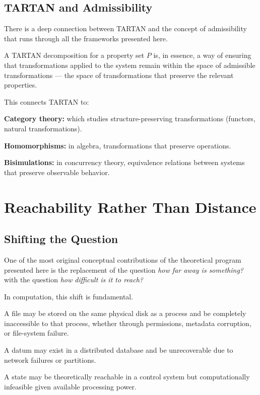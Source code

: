 \documentclass[11pt, a4paper]{article}
\theoremstyle{named}
\begin{document}
\subsection{TARTAN and Admissibility}

There is a deep connection between TARTAN and the concept of
admissibility that runs through all the frameworks presented here.

A TARTAN decomposition for a property set $P$ is, in essence, a way
of ensuring that transformations applied to the system remain within
the space of admissible transformations --- the space of
transformations that preserve the relevant properties.

This connects TARTAN to:

\textbf{Category theory:} which studies structure-preserving
transformations (functors, natural transformations).

\textbf{Homomorphisms:} in algebra, transformations that preserve
operations.

\textbf{Bisimulations:} in concurrency theory, equivalence relations
between systems that preserve observable behavior.

\section{Reachability Rather Than Distance}

\subsection{Shifting the Question}

One of the most original conceptual contributions of the theoretical
program presented here is the replacement of the question \emph{how
far away is something?} with the question \emph{how difficult is it
to reach?}

In computation, this shift is fundamental.

A file may be stored on the same physical disk as a process and be
completely inaccessible to that process, whether through permissions,
metadata corruption, or file-system failure.

A datum may exist in a distributed database and be unrecoverable due
to network failures or partitions.

A state may be theoretically reachable in a control system but
computationally infeasible given available processing power.
\end{document}
